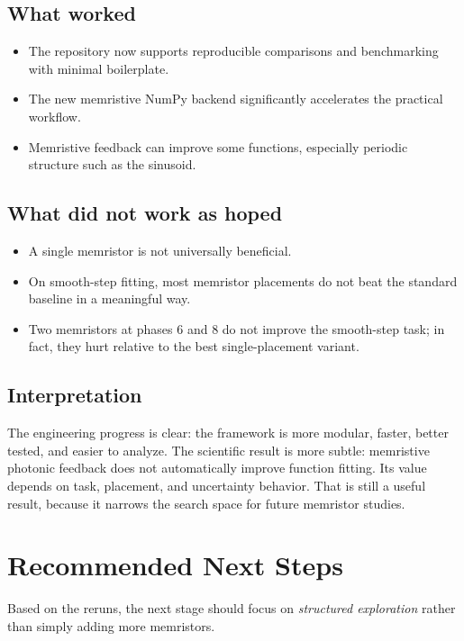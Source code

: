 \documentclass[11pt,a4paper]{article}
\begin{document}
\subsection{What worked}
\begin{itemize}[leftmargin=*]
    \item The repository now supports reproducible comparisons and benchmarking with minimal boilerplate.
    \item The new memristive NumPy backend significantly accelerates the practical workflow.
    \item Memristive feedback can improve some functions, especially periodic structure such as the sinusoid.
\end{itemize}

\subsection{What did not work as hoped}
\begin{itemize}[leftmargin=*]
    \item A single memristor is not universally beneficial.
    \item On smooth-step fitting, most memristor placements do not beat the standard baseline in a meaningful way.
    \item Two memristors at phases 6 and 8 do not improve the smooth-step task; in fact, they hurt relative to the best single-placement variant.
\end{itemize}

\subsection{Interpretation}
The engineering progress is clear: the framework is more modular, faster, better tested, and easier to analyze. The scientific result is more subtle: memristive photonic feedback does not automatically improve function fitting. Its value depends on task, placement, and uncertainty behavior. That is still a useful result, because it narrows the search space for future memristor studies.

\section{Recommended Next Steps}

Based on the reruns, the next stage should focus on \emph{structured exploration} rather than simply adding more memristors.
\end{document}
